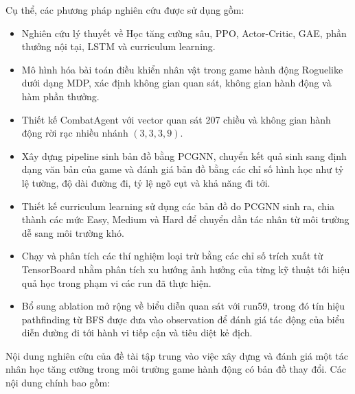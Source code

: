 Cụ thể, các phương pháp nghiên cứu được sử dụng gồm:
\renewcommand{\labelitemi}{$-$}
\begin{itemize}
    \item Nghiên cứu lý thuyết về Học tăng cường sâu, PPO, Actor-Critic, GAE, phần thưởng nội tại, LSTM và curriculum learning.
    \item Mô hình hóa bài toán điều khiển nhân vật trong game hành động Roguelike dưới dạng MDP, xác định không gian quan sát, không gian hành động và hàm phần thưởng.
    \item Thiết kế CombatAgent với vector quan sát 207 chiều và không gian hành động rời rạc nhiều nhánh $(3,3,3,9)$.
    \item Xây dựng pipeline sinh bản đồ bằng PCGNN, chuyển kết quả sinh sang định dạng văn bản của game và đánh giá bản đồ bằng các chỉ số hình học như tỷ lệ tường, độ dài đường đi, tỷ lệ ngõ cụt và khả năng đi tới.
    \item Thiết kế curriculum learning sử dụng các bản đồ do PCGNN sinh ra, chia thành các mức Easy, Medium và Hard để chuyển dần tác nhân từ môi trường dễ sang môi trường khó.
    \item Chạy và phân tích các thí nghiệm loại trừ bằng các chỉ số trích xuất từ TensorBoard nhằm phân tích xu hướng ảnh hưởng của từng kỹ thuật tới hiệu quả học trong phạm vi các run đã thực hiện.
    \item Bổ sung ablation mở rộng về biểu diễn quan sát với run59, trong đó tín hiệu pathfinding từ BFS được đưa vào observation để đánh giá tác động của biểu diễn đường đi tới hành vi tiếp cận và tiêu diệt kẻ địch.
\end{itemize}

\vspace{0.3cm}


Nội dung nghiên cứu của đề tài tập trung vào việc xây dựng và đánh giá một tác nhân học tăng cường trong môi trường game hành động có bản đồ thay đổi. Các nội dung chính bao gồm:

